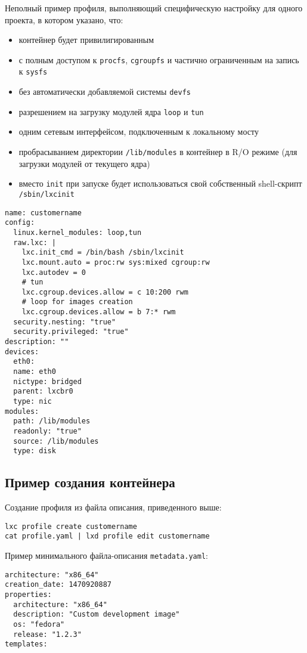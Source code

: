 \documentclass[10pt, a5paper]{article}
\begin{document}
Неполный пример профиля, выполняющий специфическую настройку для одного проекта, 
в котором указано, что:
\begin{itemize}
    \item контейнер будет привилигированным
    \item с полным доступом к {\tt procfs}, {\tt cgroupfs} 
        и частично ограниченным на запись к {\tt sysfs}
    \item без автоматически добавляемой системы {\tt devfs}
    \item разрешением на загрузку модулей ядра {\tt loop} и {\tt tun}
    \item одним сетевым интерфейсом, подключенным к локальному мосту
    \item пробрасыванием директории {\tt /lib/modules} в контейнер 
        в R/O режиме (для загрузки модулей от текущего ядра)
    \item вместо {\tt init} при запуске будет использоваться свой 
        собственный shell-скрипт {\tt /sbin/lxcinit}
\end{itemize}

\begin{verbatim}
name: customername
config:
  linux.kernel_modules: loop,tun
  raw.lxc: |
    lxc.init_cmd = /bin/bash /sbin/lxcinit
    lxc.mount.auto = proc:rw sys:mixed cgroup:rw
    lxc.autodev = 0
    # tun
    lxc.cgroup.devices.allow = c 10:200 rwm
    # loop for images creation
    lxc.cgroup.devices.allow = b 7:* rwm
  security.nesting: "true"
  security.privileged: "true"
description: ""
devices:
  eth0:
  name: eth0
  nictype: bridged
  parent: lxcbr0
  type: nic
modules:
  path: /lib/modules
  readonly: "true"
  source: /lib/modules
  type: disk
\end{verbatim}

\subsection*{Пример создания контейнера}

Создание профиля из файла описания, приведенного выше:

\begin{verbatim}
lxc profile create customername
cat profile.yaml | lxd profile edit customername
\end{verbatim}

Пример минимального файла-описания {\tt metadata.yaml}:
\begin{verbatim}
architecture: "x86_64"
creation_date: 1470920887
properties:
  architecture: "x86_64"
  description: "Custom development image"
  os: "fedora"
  release: "1.2.3"
templates:
\end{verbatim}
\end{document}
